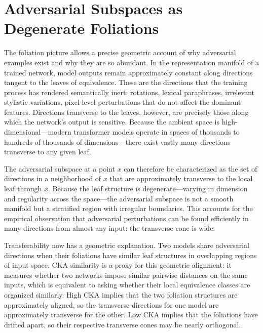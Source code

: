 \documentclass[12pt,a4paper]{article}
\theoremstyle{plain}
\theoremstyle{definition}
\begin{document}
\section{Adversarial Subspaces as Degenerate Foliations}

The foliation picture allows a precise geometric account of why adversarial examples exist and why they are so abundant. In the representation manifold of a trained network, model outputs remain approximately constant along directions tangent to the leaves of equivalence. These are the directions that the training process has rendered semantically inert: rotations, lexical paraphrases, irrelevant stylistic variations, pixel-level perturbations that do not affect the dominant features. Directions transverse to the leaves, however, are precisely those along which the network's output is sensitive. Because the ambient space is high-dimensional---modern transformer models operate in spaces of thousands to hundreds of thousands of dimensions---there exist vastly many directions transverse to any given leaf.

The adversarial subspace at a point $x$ can therefore be characterized as the set of directions in a neighborhood of $x$ that are approximately transverse to the local leaf through $x$. Because the leaf structure is degenerate---varying in dimension and regularity across the space---the adversarial subspace is not a smooth manifold but a stratified region with irregular boundaries. This accounts for the empirical observation that adversarial perturbations can be found efficiently in many directions from almost any input: the transverse cone is wide.

Transferability now has a geometric explanation. Two models share adversarial directions when their foliations have similar leaf structures in overlapping regions of input space. CKA similarity is a proxy for this geometric alignment: it measures whether two networks impose similar pairwise distances on the same inputs, which is equivalent to asking whether their local equivalence classes are organized similarly. High CKA implies that the two foliation structures are approximately aligned, so the transverse directions for one model are approximately transverse for the other. Low CKA implies that the foliations have drifted apart, so their respective transverse cones may be nearly orthogonal.
\end{document}
